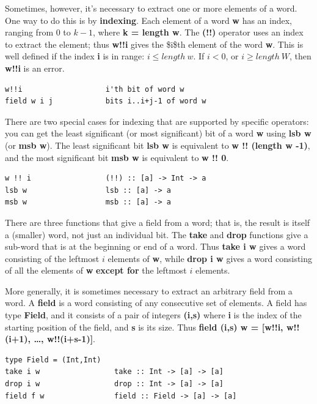 \documentclass[]{svmono}
\begin{document}
Sometimes, however, it's necessary to extract one or more elements of
a word.  One way to do this is by \textbf{indexing}.  Each element of a
word \textbf{w} has an index, ranging from 0 to \(k-1\), where \textbf{k = length w}.
The \textbf{(!!)} operator uses an index to extract the element; thus \textbf{w!!i}
gives the \$i\$th element of the word \textbf{w}.  This is well defined if the
index \textbf{i} is in range: \(i \leq length\ w\).  If \(i<0\), or \(i \geq
length\  W\), then \textbf{w!!i} is an error.



\begin{verbatim}
w!!i                   i'th bit of word w
field w i j            bits i..i+j-1 of word w
\end{verbatim}

There are two special cases for indexing that are supported by
specific operators: you can get the least significant (or most
significant) bit of a word \textbf{w} using \textbf{lsb w} (or \textbf{msb w}).  The least
significant bit \textbf{lsb w} is equivalent to \textbf{w !! (length w -1)}, and the
most significant bit \textbf{msb w} is equivalent to \textbf{w !! 0}.


\begin{verbatim}
w !! i                 (!!) :: [a] -> Int -> a
lsb w                  lsb :: [a] -> a
msb w                  msb :: [a] -> a
\end{verbatim}


There are three functions that give a field from a word; that is, the
result is itself a (smaller) word, not just an individual bit.  The
\textbf{take} and \textbf{drop} functions give a sub-word that is at the beginning
or end of a word.  Thus \textbf{take i w} gives a word consisting of the
leftmost \(i\) elements of \textbf{w}, while \textbf{drop i w} gives a word consisting
of all the elements of \textbf{w} \textbf{except for} the leftmost \(i\)
elements.

More generally, it is sometimes necessary to extract an arbitrary
field from a word.  A \textbf{field} is a word consisting of any
consecutive set of elements.  A field has type \textbf{Field}, and it
consists of a pair of integers \textbf{(i,s)} where \textbf{i} is the index of the
starting position of the field, and \textbf{s} is its size.  Thus \textbf{field
(i,s) w = [w!!i, w!!(i+1), \ldots{}, w!!(i+s-1)]}.



\begin{verbatim}
type Field = (Int,Int)
take i w                 take :: Int -> [a] -> [a]
drop i w                 drop :: Int -> [a] -> [a]
field f w                field :: Field -> [a] -> [a]
\end{verbatim}
\end{document}
